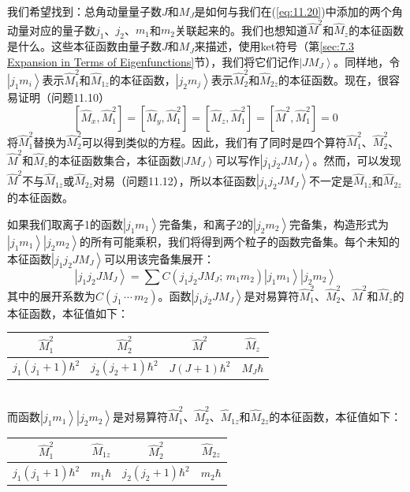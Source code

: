     我们希望找到：总角动量量子数$J$和$M_J$是如何与我们在(\ref{eq:11.20})中添加的两个角动量对应的量子数$j_1$、$j_2$、$m_1$和$m_2$关联起来的。我们也想知道$\hat{M}^2$和$\hat{M}_z$的本征函数是什么。这些本征函数由量子数$J$和$M_J$来描述，使用ket符号（第\ref{sec:7.3 Expansion in Terms of Eigenfunctions}节），我们将它们记作$\left| JM_J \right\rangle$。同样地，令$\left|j_1m_i\right\rangle$表示$\hat{M}_1^2$和$\hat{M}_{1z}$的本征函数，$\left|j_2m_j\right\rangle$表示$\hat{M}_2^2$和$\hat{M}_{2z}$的本征函数。现在，很容易证明（问题11.10）
    \begin{equation}
        \left[\hat{M}_{x},\hat{M}_{1}^{2}\right]=\left[\hat{M}_{y},\hat{M}_{1}^{2}\right]=\left[\hat{M}_{z},\hat{M}_{1}^{2}\right]=\left[\hat{M}^{2},\hat{M}_{1}^{2}\right]=0
        \label{eq:11.32}
    \end{equation}
    将$\hat{M}_1^2$替换为$\hat{M}_2^2$可以得到类似的方程。因此，我们有了同时是四个算符$\hat{M}_1^2$、$\hat{M}_2^2$、$\hat{M}^2$和$\hat{M}_z$的本征函数集合，本征函数$\left| J M_J \right\rangle$可以写作$\left| j_1 j_2 J M_J \right\rangle$。然而，可以发现$\hat{M}^2$不与$\hat{M}_{1z}$或$\hat{M}_{2z}$对易（问题11.12），所以本征函数$\left| j_1 j_2 J M_J \right\rangle$不一定是$\hat{M}_{1z}$和$\hat{M}_{2z}$的本征函数。

    如果我们取离子1的函数$\left| j_1 m_1 \right\rangle$完备集，和离子2的$\left| j_2 m_2 \right\rangle$完备集，构造形式为$\left| j_1 m_1 \right\rangle \left| j_2 m_2 \right\rangle$的所有可能乘积，我们将得到两个粒子的函数完备集。每个未知的本征函数$\left| j_1 j_2 J M_J \right\rangle$可以用该完备集展开：
    \begin{equation}
        \left| j_1 j_2 J M_J \right\rangle = \sum C \left(j_1 j_2 J M_J; \, m_1 m_2\right)\left| j_1 m_1 \right\rangle \left| j_2 m_2 \right\rangle
        \label{eq:11.33}
    \end{equation}
    其中的展开系数为$C\left(j_1 \, \cdots \, m_2\right)$。函数$\left| j_1 j_2 J M_J \right\rangle$是对易算符$\hat{M}_1^2$、$\hat{M}_2^2$、$\hat{M}^2$和$\hat{M}_z$的本征函数，本征值如下：
    \begin{table}[htbp]
        \centering
        \begin{tabular}{c|c|c|c}
            $\hat{M}_1^2$ & $\hat{M}_2^2$ & $\hat{M}^2$ & $\hat{M}_z$ \\
            \hline
            $j_1\left(j_1 + 1\right)\hbar^2$ & $j_2\left(j_2 + 1\right)\hbar^2$ & $J\left(J + 1\right)\hbar^2$ & $M_J \hbar$
        \end{tabular}
    \end{table} \\
    而函数$\left| j_1 m_1 \right\rangle \left| j_2 m_2 \right\rangle$是对易算符$\hat{M}_1^2$、$\hat{M}_2^2$、$\hat{M}_{1z}$和$\hat{M}_{2z}$的本征函数，本征值如下：
    \begin{table}[htbp]
        \centering
        \begin{tabular}{c|c|c|c}
            $\hat{M}_1^2$ & $\hat{M}_{1z}$ & $\hat{M}_2^2$ & $\hat{M}_{2z}$ \\
            \hline
            $j_1\left(j_1 + 1\right)\hbar^2$ & $m_1 \hbar$ & $j_2\left(j_2 + 1\right)\hbar^2$ & $m_2 \hbar$
        \end{tabular}
    \end{table}

